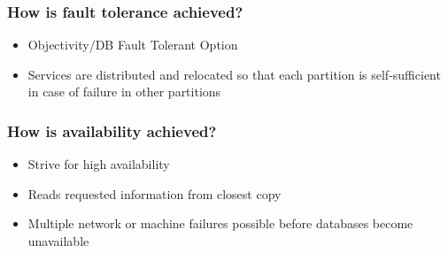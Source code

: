 \begin{frame}
\frametitle{How is fault tolerance achieved?}
\begin{itemize}
\item Objectivity/DB Fault Tolerant Option
\item Services are distributed and relocated so that each partition is self-sufficient in case of failure in other partitions
	
\end{itemize}
\end{frame} 
\begin{frame}

\frametitle{How is availability achieved?}
\begin{itemize}
\item Strive for high availability 
\item Reads requested information from closest copy
\item Multiple network or machine failures possible before databases become unavailable
\end{itemize}
\end{frame} 
